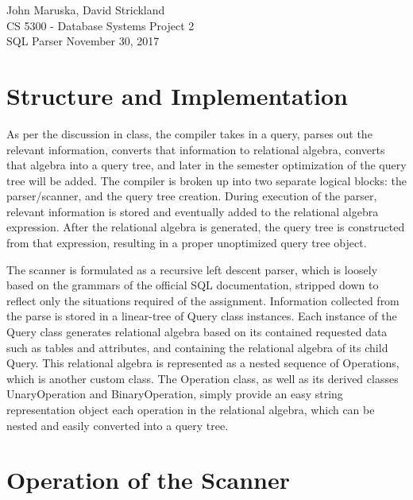 \documentclass[]{article}
\begin{document}
	\noindent John Maruska, David Strickland \\
	CS 5300 - Database Systems \hfill Project 2 \\
	SQL Parser \hfill November 30, 2017
	
	\noindent\hrulefill 
	\doublespacing

	\section{Structure and Implementation}
	
	As per the discussion in class, the compiler takes in a query, parses out the relevant information, converts that information to relational algebra, converts that algebra into a query tree, and later in the semester optimization of the query tree will be added. The compiler is broken up into two separate logical blocks: the parser/scanner, and the query tree creation. During execution of the parser, relevant information is stored and eventually added to the relational algebra expression. After the relational algebra is generated, the query tree is constructed from that expression, resulting in a proper unoptimized query tree object.
	
	The scanner is formulated as a recursive left descent parser, which is loosely based on the grammars of the official SQL documentation, stripped down to reflect only the situations required of the assignment. Information collected from the parse is stored in a linear-tree of Query class instances. Each instance of the Query class generates relational algebra based on its contained requested data such as tables and attributes, and containing the relational algebra of its child Query. This relational algebra is represented as a nested sequence of Operations, which is another custom class. The Operation class, as well as its derived classes UnaryOperation and BinaryOperation, simply provide an easy string representation object each operation in the relational algebra, which can be nested and easily converted into a query tree. 

	
	\section{Operation of the Scanner}
	
\end{document}
